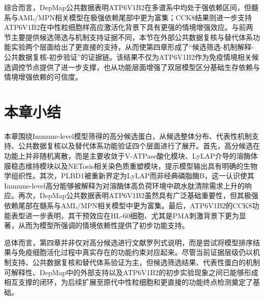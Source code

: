 综合而言，DepMap公共数据表明ATP6V1B2在多谱系中均处于强依赖区间，但髓系与AML/MPN相关模型在极强依赖尾部中更为富集；CCK8结果则进一步支持ATP6V1B2在中性粒细胞样高应激活化背景下具有更强的情境增强效应。与前两节主要提供候选筛选与机制支持证据不同，本节在外部公共数据复核与替代体系功能实验两个层面给出了更直接的支持，从而使第四章形成了“候选筛选-机制解释-公共数据复核-初步验证”的证据链。该结果不仅为ATP6V1B2作为免疫情境相关候选调控节点提供了进一步支撑，也从功能层面增强了双层模型区分基础生存依赖与情境增强依赖的可信度。

\section{本章小结}

本章围绕Immune-level模型筛得的高分候选蛋白，从候选整体分布、代表性机制支持、公共数据复核以及替代体系功能验证四个层面进行了展开。首先，高分候选在功能上并非随机离散，而是主要收敛于V-ATPase酸化模块、LyLAP介导的溶酶体膜稳态维持模块以及NETosis相关染色质重塑模块，提示模型输出具有明确的生物学组织性。其次，PLBD1被重新界定为LyLAP而非经典磷脂酶B，这一认识使其Immune-level高分能够被解释为对溶酶体高负荷环境中疏水肽清除需求上升的响应。再次，DepMap公共数据表明ATP6V1B2虽然具有广泛基础重要性，但其极强依赖尾部在髓系与AML/MPN相关模型中更为富集。最后，ATP6V1B2的CCK8功能表型进一步表明，其干预效应在HL-60细胞、尤其是PMA刺激背景下更为显著，从而为模型所强调的情境依赖性提供了初步功能支持。

总体而言，第四章并非仅对高分候选进行文献罗列式说明，而是尝试将模型排序结果与免疫细胞活化过程中真实存在的功能约束对应起来。尽管当前证据层级仍以机制支持、公共数据复核和替代体系验证为主，但候选筛选结果、代表性蛋白的机制可解释性、DepMap中的外部支持以及ATP6V1B2的初步实验现象之间已能够形成相互支撑的闭环，为后续扩展至原代中性粒细胞和更直接的功能终点检测奠定了基础。

